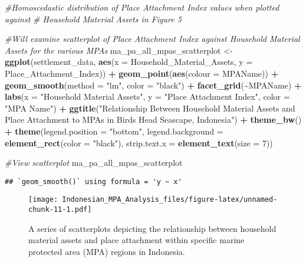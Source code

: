 \documentclass[
]{article}
\newenvironment{Shaded}{\begin{snugshade}}{\end{snugshade}}
\newcommand{\AttributeTok}[1]{\textcolor[rgb]{0.13,0.29,0.53}{#1}}
\newcommand{\CommentTok}[1]{\textcolor[rgb]{0.56,0.35,0.01}{\textit{#1}}}
\newcommand{\DecValTok}[1]{\textcolor[rgb]{0.00,0.00,0.81}{#1}}
\newcommand{\FunctionTok}[1]{\textcolor[rgb]{0.13,0.29,0.53}{\textbf{#1}}}
\newcommand{\NormalTok}[1]{#1}
\newcommand{\OtherTok}[1]{\textcolor[rgb]{0.56,0.35,0.01}{#1}}
\newcommand{\SpecialCharTok}[1]{\textcolor[rgb]{0.81,0.36,0.00}{\textbf{#1}}}
\newcommand{\StringTok}[1]{\textcolor[rgb]{0.31,0.60,0.02}{#1}}
\begin{document}
\begin{Shaded}
\begin{Highlighting}[]
\CommentTok{\#Homoscedastic distribution of Place Attachment Index values when plotted against }
\CommentTok{\# Household Material Assets in Figure 5}

\CommentTok{\#Will examine scatterplot of Place Attachment Index against Household Material Assets for the various MPAs}
\NormalTok{ma\_pa\_all\_mpas\_scatterplot }\OtherTok{\textless{}{-}} \FunctionTok{ggplot}\NormalTok{(settlement\_data, }\FunctionTok{aes}\NormalTok{(}\AttributeTok{x =}\NormalTok{ Household\_Material\_Assets,}
                            \AttributeTok{y =}\NormalTok{ Place\_Attachment\_Index)) }\SpecialCharTok{+}
  \FunctionTok{geom\_point}\NormalTok{(}\FunctionTok{aes}\NormalTok{(}\AttributeTok{colour =}\NormalTok{ MPAName)) }\SpecialCharTok{+}
  \FunctionTok{geom\_smooth}\NormalTok{(}\AttributeTok{method =} \StringTok{"lm"}\NormalTok{, }\AttributeTok{color =} \StringTok{"black"}\NormalTok{) }\SpecialCharTok{+}
  \FunctionTok{facet\_grid}\NormalTok{(}\SpecialCharTok{\textasciitilde{}}\NormalTok{MPAName) }\SpecialCharTok{+}
  \FunctionTok{labs}\NormalTok{(}\AttributeTok{x =} \StringTok{"Household Material Assets"}\NormalTok{,}
       \AttributeTok{y =} \StringTok{"Place Attachment Index"}\NormalTok{,}
       \AttributeTok{color =} \StringTok{"MPA Name"}\NormalTok{) }\SpecialCharTok{+}
  \FunctionTok{ggtitle}\NormalTok{(}\StringTok{"Relationship Between Household Material Assets and Place Attachment }
\StringTok{          to MPAs in Bird\textquotesingle{}s Head Seascape, Indonesia"}\NormalTok{) }\SpecialCharTok{+}
  \FunctionTok{theme\_bw}\NormalTok{() }\SpecialCharTok{+}
  \FunctionTok{theme}\NormalTok{(}\AttributeTok{legend.position =} \StringTok{"bottom"}\NormalTok{,}
        \AttributeTok{legend.background =} \FunctionTok{element\_rect}\NormalTok{(}\AttributeTok{color =} \StringTok{"black"}\NormalTok{),}
        \AttributeTok{strip.text.x =} \FunctionTok{element\_text}\NormalTok{(}\AttributeTok{size =} \DecValTok{7}\NormalTok{))}

\CommentTok{\#View scatterplot}
\NormalTok{ma\_pa\_all\_mpas\_scatterplot}
\end{Highlighting}
\end{Shaded}

\begin{verbatim}
## `geom_smooth()` using formula = 'y ~ x'
\end{verbatim}

\begin{figure}
\centering
\texttt{[image: Indonesian\_MPA\_Analysis\_files/figure-latex/unnamed-chunk-11-1.pdf]}
\caption{A series of scatterplots depicting the relationship between
household material assets and place attachment within specific marine
protected area (MPA) regions in Indonesia.}
\end{figure}
\end{document}
